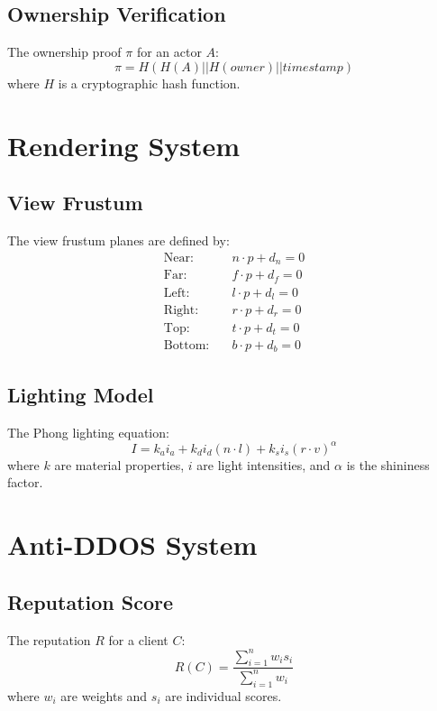 \documentclass{article}
\begin{document}
\subsection{Ownership Verification}
The ownership proof $\pi$ for an actor $A$:
\begin{equation}
\pi = H(H(A) || H(owner) || timestamp)
\end{equation}
where $H$ is a cryptographic hash function.

\section{Rendering System}

\subsection{View Frustum}
The view frustum planes are defined by:
\begin{equation}
\begin{aligned}
\text{Near}: & \quad n \cdot p + d_n = 0 \\
\text{Far}: & \quad f \cdot p + d_f = 0 \\
\text{Left}: & \quad l \cdot p + d_l = 0 \\
\text{Right}: & \quad r \cdot p + d_r = 0 \\
\text{Top}: & \quad t \cdot p + d_t = 0 \\
\text{Bottom}: & \quad b \cdot p + d_b = 0
\end{aligned}
\end{equation}

\subsection{Lighting Model}
The Phong lighting equation:
\begin{equation}
I = k_a i_a + k_d i_d (n \cdot l) + k_s i_s (r \cdot v)^\alpha
\end{equation}
where $k$ are material properties, $i$ are light intensities, and $\alpha$ is the shininess factor.

\section{Anti-DDOS System}

\subsection{Reputation Score}
The reputation $R$ for a client $C$:
\begin{equation}
R(C) = \frac{\sum_{i=1}^{n} w_i s_i}{\sum_{i=1}^{n} w_i}
\end{equation}
where $w_i$ are weights and $s_i$ are individual scores.
\end{document}
